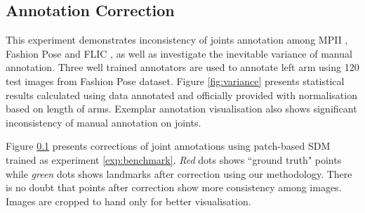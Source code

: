 \subsection{Annotation Correction}
\label{exp:qualitative}

This experiment demonstrates inconsistency of joints annotation among MPII \cite{andriluka14cvpr}, Fashion Pose \cite{dantone2013human} and FLIC \cite{sapp2013modec}, as well as investigate the inevitable variance of manual annotation. Three well trained annotators are used to annotate left arm using 120 test images from Fashion Pose \cite{dantone2013human} dataset. Figure \ref{fig:variance} presents statistical results calculated using data annotated and officially provided with normalisation based on length of arms. Exemplar annotation visualisation also shows significant inconsistency of manual annotation on joints.

Figure \ref{exp:qualitative} presents corrections of joint annotations using patch-based SDM trained as experiment \ref{exp:benchmark}. \emph{Red} dots shows ``ground truth" points while \emph{green} dots shows landmarks after correction using our methodology. There is no doubt that points after correction show more consistency among images. Images are cropped to hand only for better visualisation. 